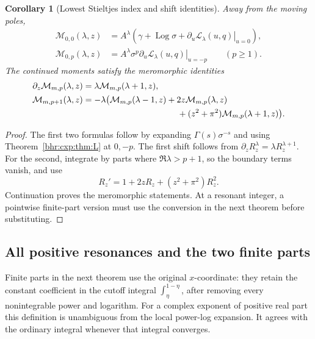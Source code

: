 \documentclass[11pt]{article}
\numberwithin{equation}{section}
\theoremstyle{plain}
\newtheorem{corollary}[theorem]{Corollary}
\theoremstyle{definition}
\theoremstyle{remark}
\DeclareMathOperator{\Log}{Log}
\begin{document}
\begin{corollary}[Lowest Stieltjes index and shift identities]
\label{bhr:cxp:cor:shifts}
Away from the moving poles,
\begin{align*}
 \mathcal M_{0,0}(\lambda,z)
 &=A^\lambda\left(
   \gamma+\Log\sigma+
         \left.\partial_u\mathcal L_\lambda(u,q)\right|_{u=0}\right),\\
 \mathcal M_{0,p}(\lambda,z)
 &=A^\lambda\sigma^p
         \left.\partial_u\mathcal L_\lambda(u,q)\right|_{u=-p}
                                      \qquad(p\ge1).
\end{align*}
The continued moments satisfy the meromorphic identities
\begin{align}
 \partial_z\mathcal M_{m,p}(\lambda,z)
   &=\lambda\mathcal M_{m,p}(\lambda+1,z),\label{bhr:cxp:eq:zshift}\\
 \mathcal M_{m,p+1}(\lambda,z)
   &=-\lambda\bigl(
       \mathcal M_{m,p}(\lambda-1,z)
       +2z\mathcal M_{m,p}(\lambda,z)\notag\\
   &\hspace{39mm}
       +(z^2+\pi^2)\mathcal M_{m,p}(\lambda+1,z)\bigr).
       \label{bhr:cxp:eq:pshift}
\end{align}
\end{corollary}
\begin{proof}
The first two formulas follow by expanding \(\Gamma(s)\sigma^{-s}\)
and using Theorem~\ref{bhr:cxp:thm:L} at \(0,-p\).
The first shift follows from
\(\partial_zR_z^\lambda=\lambda R_z^{\lambda+1}\).
For the second, integrate by parts where \(\Re\lambda>p+1\),
so the boundary terms vanish, and use
\[
 R_z'=1+2zR_z+(z^2+\pi^2)R_z^2.
\]
Continuation proves the meromorphic statements.  At a resonant
integer, a pointwise finite-part version must use the conversion
in the next theorem before substituting.
\end{proof}

\subsection{All positive resonances and the two finite parts}

Finite parts in the next theorem use the original \(x\)-coordinate:
they retain the constant coefficient in the cutoff integral
\(\int_\eta^{1-\eta}\), after removing every nonintegrable power
and logarithm.  For a complex exponent of positive real part this
definition is unambiguous from the local power-log expansion.
It agrees with the ordinary integral whenever that integral converges.
\end{document}
